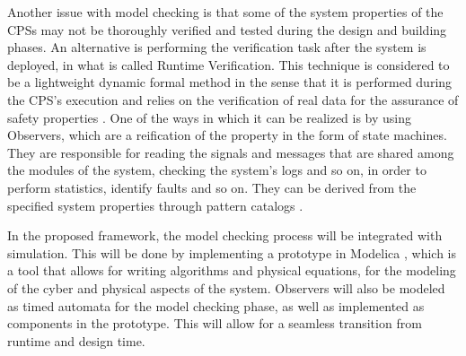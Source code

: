 



Another issue with model checking is that some of the system properties of the CPSs may not be thoroughly verified and tested during the design and building phases. An alternative is performing the verification task after the system is deployed, in what is called Runtime Verification. This technique is considered to be a lightweight dynamic formal method in the sense that it is performed during the CPS's execution and relies on the verification of real data for the assurance of safety properties \cite{colombo2021runtime}. One of the ways in which it can be realized is by using Observers, which are a reification of the property in the form of state machines. They are responsible for reading the signals and messages that are shared among the modules of the system, checking the system's logs and so on, in order to perform statistics, identify faults and so on. They can be derived from the specified system properties through pattern catalogs \cite{2022PSP}.

In the proposed framework, the model checking process will be integrated with simulation. This will be done by implementing a prototype in Modelica \cite{Modelica}, which is a tool that allows for writing algorithms and physical equations, for the modeling of the cyber and physical aspects of the system. Observers will also be modeled as timed automata for the model checking phase, as well as implemented as components in the prototype. This will allow for a seamless transition from runtime and design time.







